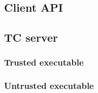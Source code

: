 %
%
%

\subsection{Client API}
\subsection{TC server}
\subsubsection{Trusted executable}
\subsubsection{Untrusted executable}

